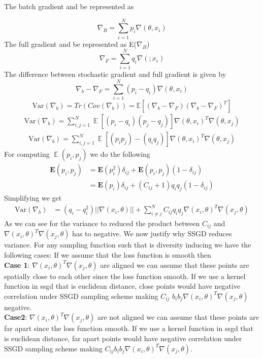 \documentclass[a4paper,twoside]{iiththesis}
\theoremstyle{definition}
\theoremstyle{definition}
\theoremstyle{remark}
\DeclareMathOperator*{\E}{\mathop{\mathbb{E}}}
\begin{document}
The batch gradient and be represented as 


\begin{equation}
\nabla_{B} = \sum_{i=1}^{N} p_i \nabla(\theta, x_i)
\end{equation}
The full gradient and be represented as E($\nabla_B$)
\begin{equation}
\nabla_{F} = \sum_{i=1}^{N} q_i \nabla(; x_i)
\end{equation}
The difference between stochastic gradient and full gradient is given by
\begin{equation}
\nabla_{b} - \nabla_{F} = \sum_{i=1}^{N}(p_i - q_i) \nabla(\theta, x_i)
\end{equation}
\begin{equation}
\text{Var}(\nabla_b) = Tr(Cov(\nabla_b)) = \mathbb{E}[(\nabla_b - \nabla_F)(\nabla_b - \nabla_F)^T] 
\end{equation}
\begin{align}
\text{Var}(\nabla_b) = \sum_{i, j =1}^N \E\left[(p_i - q_i)(p_j - q_j)\right] \nabla(\theta, x_i)^T \nabla(\theta, x_j)
\end{align}
\begin{align}
\text{Var}(\nabla_b) = \sum_{i, j=1}^N \E[(p_i p_j) - (q_i q_j)] \nabla(\theta, x_i)^T \nabla(\theta, x_j)
\end{align}
For computing $\E(p_i, p_j)$ we do the following 
\begin{align}
\mathbf{E}(p_i, p_j) &= \mathbf{E}(p_i^2)\delta_{ij} + \mathbf{E}(p_i, p_j) (1-\delta_{ij})\\
&= \mathbf{E}(p_i)\delta_{ij} + (C_{ij} + 1) q_i q_j (1-\delta_{ij})
\end{align}Simplifying we get
\begin{align}
\text{Var}(\nabla_b) &= (q_i - q_i^2) ||\nabla(x_i, \theta)||  +  \sum_{i \neq j}^N C_{ij} q_i q_j \nabla(x_i, \theta)^T \nabla(x_j, \theta)
\end{align}
As we can see for the variance to reduced the product between $C_{ij}$ and $\nabla(x_i, \theta)^T \nabla(x_j, \theta)$ has to negative. We now justify why SSGD reduces variance. For any sampling function such that is diversity inducing we have the following cases: If we assume that the loss function is smooth then \\
\textbf{Case 1}: $\nabla(x_i, \theta)^T \nabla(x_j, \theta)$ are aligned  we can assume that these points are spatially close to each other since the loss function smooth. If we use a kernel function in ssgd that is euclidean distance, close points would have negative correlation under SSGD sampling scheme making $C_{ij}$ $b_i b_j \nabla(x_i, \theta)^T \nabla(x_j, \theta)$ negative.
\\
\textbf{Case2}:  $\nabla(x_i, \theta)^T \nabla(x_j, \theta)$ are not aligned  we can assume that these points are far apart since the loss function smooth. If we use a kernel function in ssgd that is euclidean distance, far apart points would have negative correlation under SSGD sampling scheme making $C_{ij} b_i b_j \nabla(x_i, \theta)^T \nabla(x_j, \theta).$
\end{document}
